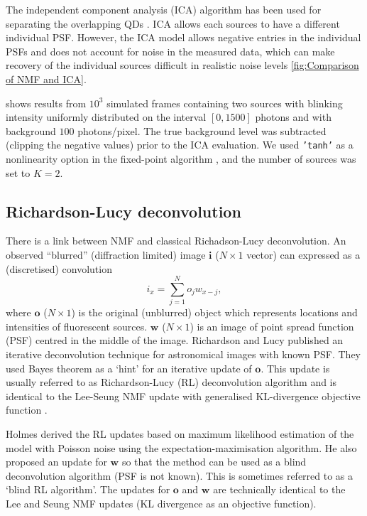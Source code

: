 The independent component analysis (ICA) algorithm \cite{Hyvarinen2000} has been used for separating the overlapping QDs \cite{Lidke2005}. ICA allows each sources to have a different individual PSF.  However, the ICA model allows negative entries in the individual PSFs and does not account for noise in the measured data, which can make recovery of the individual sources difficult in realistic noise levels \autoref{fig:Comparison of NMF and ICA}. 

 shows results from $10^{3}$ simulated frames containing two sources with blinking intensity uniformly distributed on the interval $[0, 1500]$ photons and with background $100$ photons/pixel. The true background level was subtracted (clipping the negative values) prior to the ICA evaluation. We used {\tt 'tanh'} as a nonlinearity option in the fixed-point algorithm \cite{Hyvarinen2000}, and the number of sources was set to $K=2$. 



\subsection{Richardson-Lucy deconvolution \label{sub:RL deconvolution}}
There is a link between NMF and classical Richadson-Lucy deconvolution. An observed ``blurred'' (diffraction limited) image $\bm{i}$ ($N\times1$ vector) can expressed as a (discretised) convolution 
%
\begin{equation} 
	i_{x}=\sum_{j=1}^{N}o_{j}w_{x-j}, 
\end{equation} 
%
where $\bm{o}$ ($N\times1$) is the original (unblurred) object which represents locations and intensities of fluorescent sources. $\bm{w}$ ($N\times1$) is an image of point spread function (PSF) centred in the middle of the image. Richardson \cite{Richardson1972} and Lucy \cite{Lucy1974} published an iterative deconvolution technique for astronomical images with known PSF. They used Bayes theorem as a `hint' for an iterative update of $\bm{o}$. This update is usually referred to as Richardson-Lucy (RL) deconvolution algorithm and is identical to the Lee-Seung NMF update with generalised KL-divergence objective function \cite{Lee2001}. 

Holmes \cite{Holmes:92} derived the RL updates based on maximum likelihood estimation of the model with Poisson noise using the expectation-maximisation algorithm. He also proposed an update for $\bm{w}$ so that the method can be used as a blind deconvolution algorithm (PSF is not known). This is sometimes referred to as a `blind RL algorithm'. The updates for $\bm{o}$ and $\bm{w}$ are technically identical to the Lee and Seung NMF updates (KL divergence as an objective function). 

